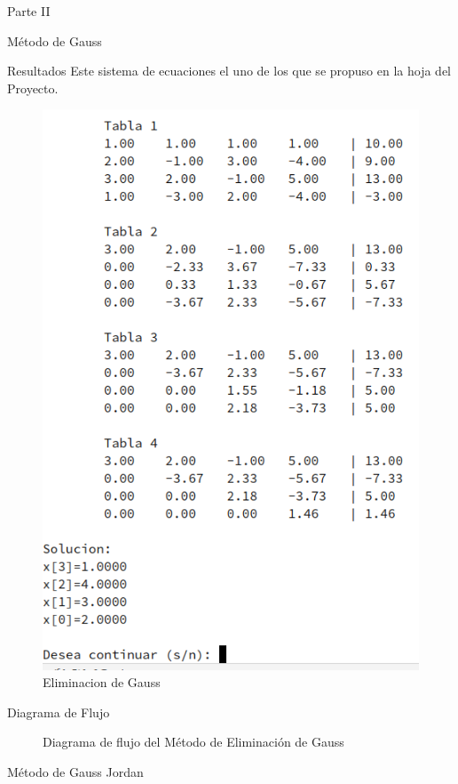 \documentclass[legalpaper, 12pt]{article}
\begin{document}
\begin{section}{Parte II}
\begin{subsection}{Método de Gauss}
\begin{subsubsection}{Resultados}
        Este sistema de ecuaciones el uno de los que se propuso en la hoja
        del Proyecto.
        \begin{figure}[h]
          \centering
          \includegraphics[scale=0.9]{gauss.png}
          \caption{Eliminacion de Gauss}
        \end{figure}
      \end{subsubsection}
      \newpage
      \begin{subsubsection}{Diagrama de Flujo}
        \begin{figure}[h]
          \centering
          
          \caption{Diagrama de flujo del Método de Eliminación de Gauss}
        \end{figure}
      \end{subsubsection}
      \break
    \end{subsection}
    \break
    \begin{subsection}{Método de Gauss Jordan}

\end{subsection}
\end{section}
\end{document}
